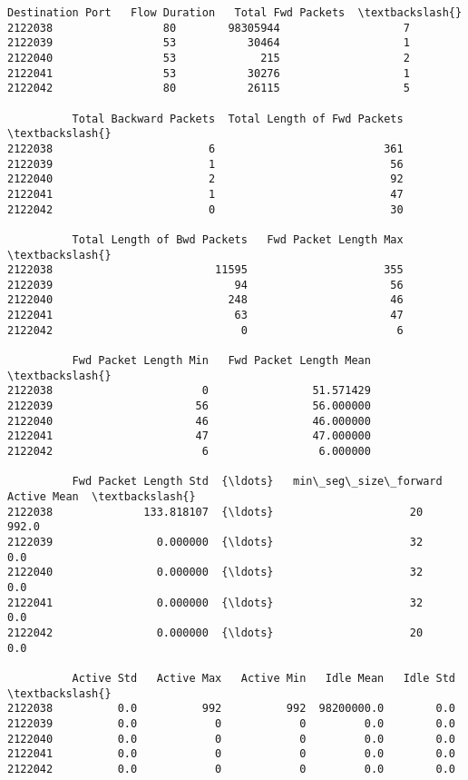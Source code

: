 \documentclass[11pt]{article}
\makeatletter
\newcommand{\boxspacing}{\kern\kvtcb@left@rule\kern\kvtcb@boxsep}
\newcommand{\prompt}[4]{
        \ttfamily\llap{{\color{#2}[#3]:\hspace{3pt}#4}}\vspace{-\baselineskip}
    }
\makeatother
\begin{document}
            \begin{tcolorbox}[breakable, size=fbox, boxrule=.5pt, pad at break*=1mm, opacityfill=0]
\prompt{Out}{outcolor}{7}{\boxspacing}
\begin{Verbatim}[commandchars=\\\{\}]
          Destination Port   Flow Duration   Total Fwd Packets  \textbackslash{}
2122038                 80        98305944                   7
2122039                 53           30464                   1
2122040                 53             215                   2
2122041                 53           30276                   1
2122042                 80           26115                   5

          Total Backward Packets  Total Length of Fwd Packets  \textbackslash{}
2122038                        6                          361
2122039                        1                           56
2122040                        2                           92
2122041                        1                           47
2122042                        0                           30

          Total Length of Bwd Packets   Fwd Packet Length Max  \textbackslash{}
2122038                         11595                     355
2122039                            94                      56
2122040                           248                      46
2122041                            63                      47
2122042                             0                       6

          Fwd Packet Length Min   Fwd Packet Length Mean  \textbackslash{}
2122038                       0                51.571429
2122039                      56                56.000000
2122040                      46                46.000000
2122041                      47                47.000000
2122042                       6                 6.000000

          Fwd Packet Length Std  {\ldots}   min\_seg\_size\_forward  Active Mean  \textbackslash{}
2122038              133.818107  {\ldots}                     20        992.0
2122039                0.000000  {\ldots}                     32          0.0
2122040                0.000000  {\ldots}                     32          0.0
2122041                0.000000  {\ldots}                     32          0.0
2122042                0.000000  {\ldots}                     20          0.0

          Active Std   Active Max   Active Min   Idle Mean   Idle Std  \textbackslash{}
2122038          0.0          992          992  98200000.0        0.0
2122039          0.0            0            0         0.0        0.0
2122040          0.0            0            0         0.0        0.0
2122041          0.0            0            0         0.0        0.0
2122042          0.0            0            0         0.0        0.0


\end{Verbatim}
\end{tcolorbox}
\end{document}
